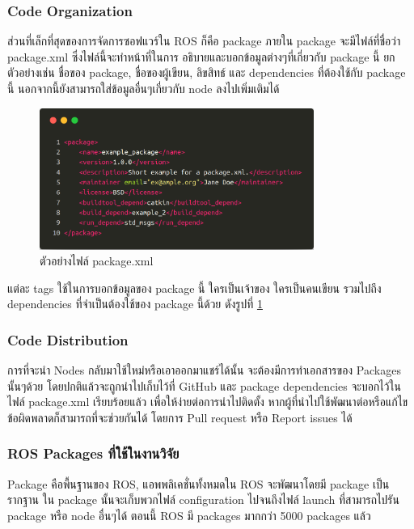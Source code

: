 \subsubsection*{Code Organization}
ส่วนที่เล็กที่สุดของการจัดการซอฟแวร์ใน ROS ก็คือ package ภายใน package จะมีไฟล์ที่ชื่อว่า package.xml
ซึ่งไฟล์นี้จะทำหน้าที่ในการ อธิบายและบอกข้อมูลต่างๆที่เกี่ยวกับ package นี้ ยกตัวอย่างเช่น
ชื่อของ package, ชื่อของผู้เขียน, ลิขสิทธ์ และ dependencies ที่ต้องใช้กับ package นี้
นอกจากนี้ยังสามารถใส่ข้อมูลอื่นๆเกี่ยวกับ node ลงไปเพิ่มเติมได้

\begin{figure}[ht]
    \centering
    \includegraphics[width=0.8\textwidth]{chapter2/images/example_packagexml.png}
	\caption{ตัวอย่างไฟล์ package.xml}
    \label{fig:example_packagexml}
\end{figure}

แต่ละ tags ใช้ในการบอกข้อมูลของ package นี้ ใครเป็นเจ้าของ ใครเป็นคนเขียน รวมไปถึง dependencies
ที่จำเป็นต้องใช้ของ package นี้ด้วย ดังรูปที่ \ref{fig:example_packagexml} 

\clearpage
\subsubsection*{Code Distribution}
การที่จะนำ Nodes กลับมาใช้ใหม่หรือเอาออกมาแชร์ได้นั้น จะต้องมีการทำเอกสารของ Packages นั้นๆด้วย
โดยปกติแล้วจะถูกนำไปเก็บไว้ที่ GitHub และ package dependencies จะบอกไว้ในไฟล์ package.xml
เรียบร้อยแล้ว เพื่อให้ง่ายต่อการนำไปติดตั้ง หากผู้ที่นำไปใช้พัฒนาต่อหรือแก้ไขข้อผิดพลาดก็สามารถที่จะช่วยกันได้
โดยการ Pull request หรือ Report issues ได้

\subsubsection*{ROS Packages ที่ใช้ในงานวิจัย}
Package คือพื้นฐานของ ROS, แอพพลิเคชั่นทั้งหมดใน ROS จะพัฒนาโดยมี package เป็นรากฐาน ใน package นั้นจะเก็บพวกไฟล์
configuration ไปจนถึงไฟล์ launch ที่สามารถไปรัน package หรือ node อื่นๆได้ ตอนนี้ ROS มี packages มากกว่า 5000 packages แล้ว

